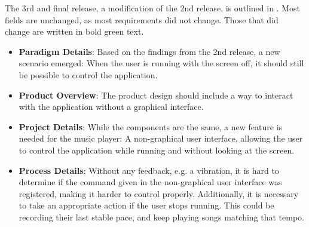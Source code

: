 The 3rd and final release, a modification of the 2nd release, is outlined in . Most fields are unchanged, as most requirements did not change. Those that did change are written in bold green text.



\begin{itemize}
\item \textbf{Paradigm Details}: Based on the findings from the 2nd release, a new scenario emerged: When the user is running with the screen off, it should still be possible to control the application.

\item \textbf{Product Overview}: The product design should include a way to interact with the application without a graphical interface.

\item \textbf{Project Details}: While the components are the same, a new feature is needed for the music player: A non-graphical user interface, allowing the user to control the application while running and without looking at the screen.

\item \textbf{Process Details}: Without any  feedback, e.g. a vibration, it is hard to determine if the command given in the non-graphical user interface was registered, making it harder to control properly. \newline
Additionally, it is necessary to take an appropriate action if the user stops running. This could be recording their last stable pace, and keep playing songs matching that tempo.
\end{itemize}